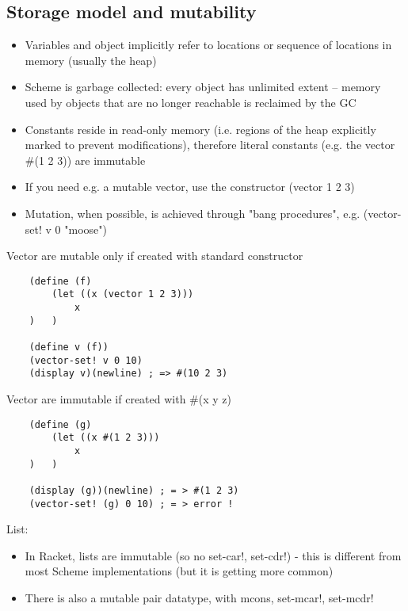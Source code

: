 \subsection{Storage model and mutability}
\begin{itemize}
    \item Variables and object implicitly refer to locations or sequence of locations in memory (usually the heap)
    \item Scheme is garbage collected: every object has unlimited extent – memory used by objects that are no longer reachable is reclaimed by the GC
    \item Constants reside in read-only memory (i.e. regions of the heap explicitly marked to prevent modifications), therefore literal constants (e.g. the vector \#(1 2 3)) are immutable
    \item If you need e.g. a mutable vector, use the constructor (vector 1 2 3)
    \item Mutation, when possible, is achieved through "bang procedures", e.g. (vector-set! v 0 "moose")
\end{itemize}
Vector are mutable only if created with standard constructor
\begin{lstlisting}
    (define (f)
        (let ((x (vector 1 2 3)))
            x
    )   )
    
    (define v (f))
    (vector-set! v 0 10)
    (display v)(newline) ; => #(10 2 3)
\end{lstlisting}
Vector are immutable if created with \#(x y z)
\begin{lstlisting}
    (define (g)
        (let ((x #(1 2 3)))
            x
    )   )

    (display (g))(newline) ; = > #(1 2 3)
    (vector-set! (g) 0 10) ; = > error !
\end{lstlisting}
List:
\begin{itemize}
    \item In Racket, lists are immutable (so no set-car!, set-cdr!) - this is different from most Scheme implementations (but it is getting more common)
    \item There is also a mutable pair datatype, with mcons, set-mcar!, set-mcdr!
\end{itemize}

